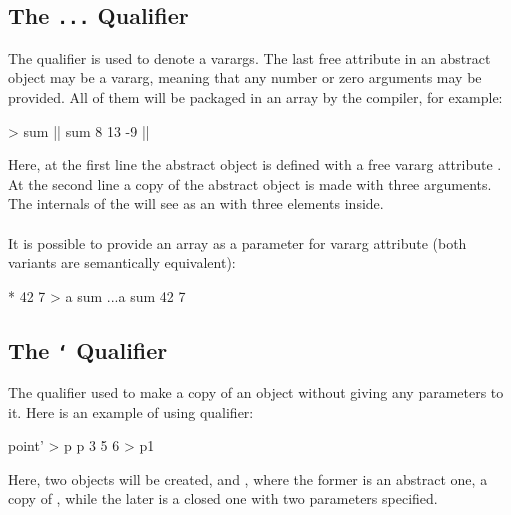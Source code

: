\documentclass[12pt]{book}
\begin{document}
\subsection{The \texttt{...} Qualifier} \label{subsec:"..."-qualifier}
The  qualifier is used to denote a varargs. The last free attribute in an abstract object may be a vararg, meaning that any number or zero arguments may be provided. All of them will be packaged in an array by the compiler, for example:
\begin{ffcode}
[x...] > sum |$\label{ln:sum-def}$|
sum 8 13 -9 |$\label{ln:sum-instance}$|
\end{ffcode}
Here, at the first line the abstract object  is defined with a free vararg attribute . At the second line a copy of the abstract object is made with three arguments. The internals of the  will see  as an  with three elements inside. 
\\
\\
It is possible to provide an array as a parameter for vararg attribute (both variants are semantically equivalent):
\begin{ffcode}
* 42 7 > a
sum ...a
sum 42 7
\end{ffcode}

\subsection{The \texttt{`} Qualifier} \label{subsec:"`"-qualifier}
The  qualifier used to make a copy of an object without giving any parameters to it. Here is an example of using  qualifier:
\begin{ffcode}
point' > p
p 3 5 6 > p1
\end{ffcode}
Here, two objects will be created,  and , where the former is an abstract one, a copy of , while the later is a closed one with two parameters specified.
\end{document}
